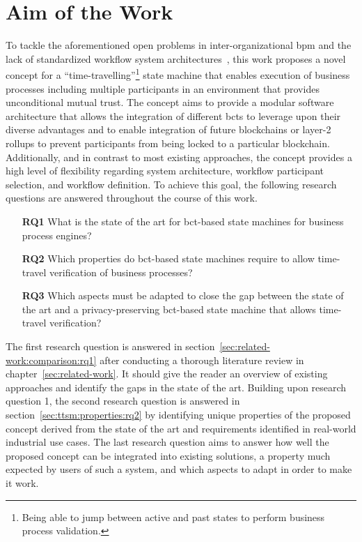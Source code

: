 \section{Aim of the Work}
\label{sec:introduction:aim_of_the_work}
To tackle the aforementioned open problems in inter-organizational \gls{bpm} and the lack of standardized workflow system architectures~\cite{prybila_master_thesis}, this work proposes a novel concept for a ``time-travelling''\footnote{Being able to jump between active and past states to perform business process validation.} state machine that enables execution of business processes including multiple participants in an environment that provides unconditional mutual trust. The concept aims to provide a modular software architecture that allows the integration of different \glspl{bct} to leverage upon their diverse advantages and to enable integration of future blockchains or layer-2 rollups to prevent participants from being locked to a particular blockchain. Additionally, and in contrast to most existing approaches, the concept provides a high level of flexibility regarding system architecture, workflow participant selection, and workflow definition. To achieve this goal, the following research questions are answered throughout the course of this work.

\begin{enumerate}
    \item[\textbf{RQ1}] What is the state of the art for \gls{bct}-based state machines for business process engines?
    \item[\textbf{RQ2}] Which properties do \gls{bct}-based state machines require to allow time-travel verification of business processes?
    \item[\textbf{RQ3}] Which aspects must be adapted to close the gap between the state of the art and a privacy-preserving \gls{bct}-based state machine that allows time-travel verification?
\end{enumerate}

The first research question is answered in section~\ref{sec:related-work:comparison:rq1} after conducting a thorough literature review in chapter~\ref{sec:related-work}. It should give the reader an overview of existing approaches and identify the gaps in the state of the art. Building upon research question 1, the second research question is answered in section~\ref{sec:ttsm:properties:rq2} by identifying unique properties of the proposed concept derived from the state of the art and requirements identified in real-world industrial use cases. The last research question aims to answer how well the proposed concept can be integrated into existing solutions, a property much expected by users of such a system, and which aspects to adapt in order to make it work.




